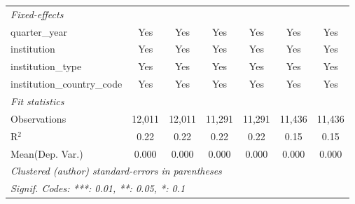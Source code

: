 \begin{tabular}{lcccccc}
   \midrule
   \emph{Fixed-effects}\\
   quarter\_year                      & Yes      & Yes        & Yes      & Yes       & Yes      & Yes\\  
   institution                        & Yes      & Yes        & Yes      & Yes       & Yes      & Yes\\  
   institution\_type                  & Yes      & Yes        & Yes      & Yes       & Yes      & Yes\\  
   institution\_country\_code         & Yes      & Yes        & Yes      & Yes       & Yes      & Yes\\  
   \midrule
   \emph{Fit statistics}\\
   Observations                       & 12,011   & 12,011     & 11,291   & 11,291    & 11,436   & 11,436\\  
   R$^2$                              & 0.22     & 0.22       & 0.22     & 0.22      & 0.15     & 0.15\\  
Mean(Dep. Var.) & 0.000 & 0.000 & 0.000 & 0.000 & 0.000 & 0.000 \\
   \midrule \midrule
   \multicolumn{7}{l}{\emph{Clustered (author) standard-errors in parentheses}}\\
   \multicolumn{7}{l}{\emph{Signif. Codes: ***: 0.01, **: 0.05, *: 0.1}}\\
\end{tabular}
\par\endgroup
